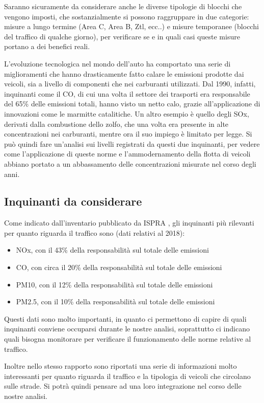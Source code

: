 \documentclass{article}
\begin{document}
Saranno sicuramente da considerare anche le diverse tipologie di blocchi che vengono imposti, che sostanzialmente si possono raggruppare in due categorie: misure a lungo termine (Area C, Area B, Ztl, ecc..) e misure temporanee (blocchi del traffico di qualche giorno), per verificare se e in quali casi queste misure portano a dei benefici reali. 

L'evoluzione tecnologica nel mondo dell'auto ha comportato una serie di miglioramenti che hanno drasticamente fatto calare le emissioni prodotte dai veicoli, sia a livello di componenti che nei carburanti utilizzati. Dal 1990, infatti, inquinanti come il CO, di cui una volta il settore dei trasporti era responsabile del 65\% delle emissioni totali, hanno visto un netto calo, grazie all'applicazione di innovazioni come le marmitte catalitiche. Un altro esempio è quello degli SOx, derivati dalla combustione dello zolfo, che una volta era presente in alte concentrazioni nei carburanti, mentre ora il suo impiego è limitato per legge. Si può quindi fare un'analisi sui livelli registrati da questi due inquinanti, per vedere come l'applicazione di queste norme e l'ammodernamento della flotta di veicoli abbiano portato a un abbassamento delle concentrazioni misurate nel corso degli anni.

\subsection{Inquinanti da considerare}
Come indicato dall'inventario pubblicato da ISPRA \cite{iir2020}, gli inquinanti più rilevanti per quanto riguarda il traffico sono (dati relativi al 2018): 
\begin{itemize}
	\item NOx, con il 43\% della responsabilità sul totale delle emissioni
	\item CO, con circa il 20\% della responsabilità sul totale delle emissioni
	\item PM10, con il 12\% della responsabilità sul totale delle emissioni
	\item PM2.5, con il 10\% della responsabilità sul totale delle emissioni
\end{itemize}
Questi dati sono molto importanti, in quanto ci permettono di capire di quali inquinanti conviene occuparsi durante le nostre analisi, soprattutto ci indicano quali bisogna monitorare per verificare il funzionamento delle norme relative al traffico. 

Inoltre nello stesso rapporto sono riportati una serie di informazioni molto interessanti per quanto riguarda il traffico e la tipologia di veicoli che circolano sulle strade. Si potrà quindi pensare ad una loro integrazione nel corso delle nostre analisi.
\end{document}
